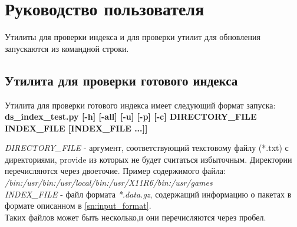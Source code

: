 \section{Руководство пользователя}
Утилиты для проверки индекса и для проверки утилит для обновления
запускаются из командной строки. \\
\subsection{Утилита для проверки готового индекса }
Утилита для проверки готового индекса имеет следующий формат запуска: \\
\textbf{ds\_index\_test.py [-h] [-all] [-u] [-p] [-c] DIRECTORY\_FILE INDEX\_FILE [INDEX\_FILE ...]]}

\emph{DIRECTORY\_FILE} - аргумент, соответствующий текстовому файлу (*.txt) с 
директориями, provide из которых не будет считаться избыточным. Директории
перечисляются  через двоеточие. Пример содержимого файла:
\textit{/bin:/usr/bin:/usr/local/bin:/usr/X11R6/bin:/usr/games}\\

\emph{INDEX\_FILE }- файл формата \textit{*.data.gz}, содержащий информацию о пакетах
в формате описанном в \ref{sn:input_format}.\\
Таких файлов может быть несколько,и они перечисляются через пробел.\\

